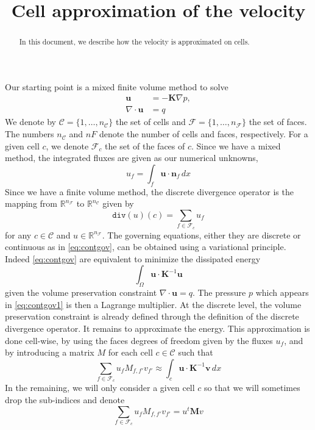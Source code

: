 \documentclass[11pt]{amsart}
\newcommand{\Real}{\mathbb R}
\newcommand{\vect}[1]{\boldsymbol{#1}}
\newcommand{\mat}[1]{\boldsymbol{#1}}
\newcommand{\grad}{\nabla}
\newcommand{\dive}{\nabla\cdot}
\newcommand{\Fcal}{\mathcal{F}}
\newcommand{\Ccal}{\mathcal{C}}
\let\code\texttt
\newcommand{\ddiv}{\code{div}\xspace}%
\newcommand{\nC}{{n_{\Ccal}}}%
\newcommand{\nF}{{n_{\Fcal}}}%
\begin{document}
\title[velocity approximation]{Cell approximation of the velocity}

\maketitle

\begin{abstract}
  In this document, we describe how the velocity is approximated on cells.
\end{abstract}


Our starting point is a mixed finite volume method to solve
\begin{subequations}
  \label{eq:contgov}
  \begin{align}
    \label{eq:contgov1}
    \vect{u} &= - \mat{K}\grad p,\\
    \dive \vect{u} &= q
  \end{align}
\end{subequations}
We denote by $\Ccal=\{1,\ldots,\nC\}$ the set of cells and $\Fcal=\{1,\ldots,\nF\}$ the set of
faces. The numbers $\nC$ and $nF$ denote the number of cells and faces, respectively. For a given
cell $c$, we denote $\Fcal_c$ the set of the faces of $c$. Since we have a mixed method, the
integrated fluxes are given as our numerical unknowns,
\begin{equation}
  \label{eq:defuf}
  u_f = \int_{f}\vect{u}\cdot\vect{n}_f\,dx
\end{equation}
Since we have a finite volume method, the discrete divergence operator is the mapping from
$\Real^\nF$ to $\Real^\nC$ given by
\begin{equation}
  \label{eq:defdiv}
  \ddiv(u)(c) = \sum_{f\in\Fcal_c}u_f
\end{equation}
for any $c\in\Ccal$ and $u\in\Real^{\nF}$. The governing equations, either they are discrete or
continuous as in \eqref{eq:contgov}, can be obtained using a variational principle. Indeed
\eqref{eq:contgov} are equivalent to minimize the dissipated energy
\begin{equation}
  \label{eq:totenergy}
  \int_{\Omega} \vect{u}\cdot\mat{K}^{-1}\vect{u}
\end{equation}
given the volume preservation constraint $\dive\vect{u} = q $. The pressure $p$ which appears in
\eqref{eq:contgov1} is then a Lagrange multiplier. At the discrete level, the volume preservation
constraint is already defined through the definition of the discrete divergence operator. It remains
to approximate the energy. This approximation is done cell-wise, by using the faces degrees of
freedom given by the fluxes $u_f$, and by introducing a matrix $M$ for each cell $c\in\Ccal$ such
that
\begin{equation}
  \label{eq:defM}
  \sum_{f\in \Fcal_c} u_f M_{f,f'} v_{f'} \approx \int_{c} \vect{u}\cdot\mat{K}^{-1}\vect{v}\,dx
\end{equation}
In the remaining, we will only consider a given cell $c$ so that we will sometimes drop the
sub-indices and denote
\begin{equation*}
  \sum_{f\in \Fcal_c} u_f M_{f,f'} v_{f'} = u^t\vect{M}v
\end{equation*}
\end{document}
